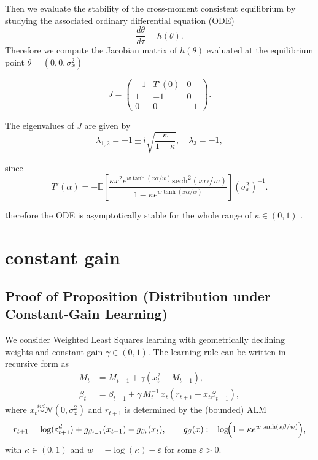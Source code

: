 \documentclass[11pt]{article}
\begin{document}
Then we evaluate the stability of the cross-moment consistent equilibrium by studying the associated ordinary differential equation (ODE)
\begin{equation}
    \frac{d \theta}{d \tau} = h(\theta).
\end{equation}
Therefore we compute the Jacobian matrix of $h(\theta)$ evaluated at the equilibrium point $\theta = (0,0,\sigma^2_x)$

\begin{equation}
    J = \begin{pmatrix}
         - 1 & T'(0) & 0 \\
        1 & -1 & 0 \\
        0 & 0 & -1
    \end{pmatrix}.
\end{equation}

The eigenvalues of $J$ are given by
\begin{equation}
    \lambda_{1,2} = -1 \pm i \sqrt{\frac{\kappa}{1 - \kappa}}, \quad \lambda_3 = - 1,
\end{equation}

since 
\begin{equation}
    T'(\alpha) = -\mathbb{E}\left[\frac{\kappa x^2 e ^ {w \tanh(x \alpha / w)} \textrm{sech}^2(x \alpha / w)}{1 - \kappa e ^ {w \tanh(x \alpha / w)} }  \right] \left(\sigma^2_x\right)^{-1} .
\end{equation}

therefore the ODE is asymptotically stable for the whole range of $\kappa \in (0,1)$ . 


\section{constant gain}

\subsection{Proof of Proposition (Distribution under Constant-Gain Learning)}\label{app:proofs_cg}

We consider Weighted Least Squares learning with geometrically declining weights and constant gain $\gamma\in(0,1)$. The learning rule can be written in recursive form as
\begin{align}
    M_t &= M_{t-1} + \gamma\left(x_t^2 - M_{t-1}\right), \label{eq:cg_M}\\
    \beta_t &= \beta_{t-1} + \gamma\, M_t^{-1}\, x_t\left(r_{t+1} - x_t \beta_{t-1}\right), \label{eq:cg_beta}
\end{align}
where $x_t\stackrel{iid}{\sim}\mathcal N(0,\sigma_x^2)$ and $r_{t+1}$ is determined by the (bounded) ALM
\begin{equation}\label{eq:cg_alm}
    r_{t+1}
    = \log(\varepsilon^d_{t+1})
    + g_{\beta_{t-1}}(x_{t-1})
    - g_{\beta_t}(x_t),
    \qquad 
    g_{\beta}(x):=\log\!\Bigl(1-\kappa e^{w\tanh(x\beta/w)}\Bigr),
\end{equation}
with $\kappa\in(0,1)$ and $w=-\log(\kappa)-\varepsilon$ for some $\varepsilon>0$.
\end{document}
